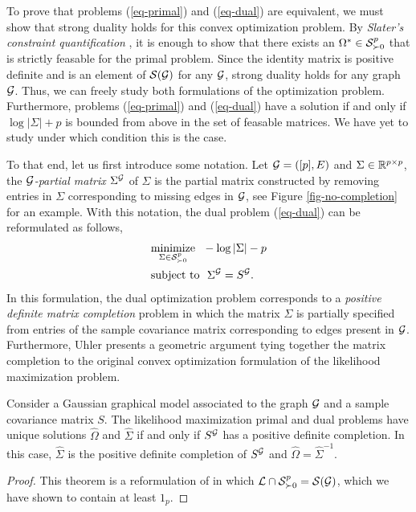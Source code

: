 To prove that problems (\ref{eq-primal}) and (\ref{eq-dual}) are equivalent, we must show that strong duality holds for this convex optimization problem. By \textit{Slater's constraint quantification} \cite[Section 5.3.2]{boyd2004convex}, it is enough to show that there exists an $\Omega^* \in \S^p_{\succ 0}$ that is strictly feasable for the primal problem. Since the identity matrix is positive definite and is an element of $\S(\G)$ for any $\G$, strong duality holds for any graph $\G$. Thus, we can freely study both formulations of the optimization problem. Furthermore, problems (\ref{eq-primal}) and (\ref{eq-dual}) have a solution if and only if $\log |\Sigma| + p$ is bounded from above in the set of feasable matrices. We have yet to study under which condition this is the case.

To that end, let us first introduce some notation. Let $\G = ([p], E)$ and $\Sigma \in \R^{p\times p}$, the \textit{$\G$-partial matrix} $\Sigma^\G$ of $\Sigma$ is the partial matrix constructed by removing entries in $\Sigma$ corresponding to missing edges in $\G$, see Figure \ref{fig-no-completion} for an example. With this notation, the dual problem (\ref{eq-dual}) can be reformulated as follows,
\begin{align} \label{eq-completion}
    \begin{split}    
        &\underset{\Sigma \in \S^p_{\succ 0}}{\t{minimize}}\ \  -\log |\Sigma| - p\\
        &\t{subject to}\ \ \Sigma^\G = S^\G.
    \end{split}
\end{align}
In this formulation, the dual optimization problem corresponds to a \textit{positive definite matrix completion} problem in which the matrix $\Sigma$ is partially specified from entries of the sample covariance matrix corresponding to edges present in $\G$. Furthermore, Uhler \cite[Section 9.4]{maathuis2018handbook} presents a geometric argument tying together the matrix completion to the original convex optimization formulation of the likelihood maximization problem.

\begin{theorem}
    Consider a Gaussian graphical model associated to the graph $\G$ and a sample covariance matrix $S$. The likelihood maximization primal and dual problems have unique solutions $\hat\Omega$ and $\hat\Sigma$ if and only if $S^\G$ has a positive definite completion. In this case, $\hat\Sigma$ is the positive definite completion of $S^\G$ and $\hat\Omega = \hat\Sigma^{-1}$.
\end{theorem}
\begin{proof}
    This theorem is a reformulation of \cite[Theorem 9.4.2]{maathuis2018handbook} in which $\c{L} \cap \S^p_{\succ 0} = \S(\G)$, which we have shown to contain at least $1_p$.
\end{proof}

